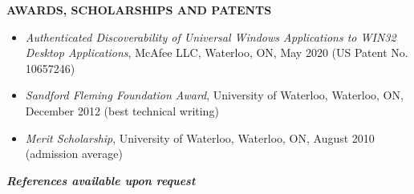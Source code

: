 \documentclass[10pt,letterpaper]{article}
\begin{document}
\textbf{AWARDS, SCHOLARSHIPS AND PATENTS} \hrulefill \\
\begin{adjustwidth}{0.1in}{0.5in}
    \begin{itemize}
    \item \emph{Authenticated Discoverability of Universal Windows Applications to WIN32 Desktop Applications}, McAfee LLC, Waterloo, ON, May 2020
	    (US Patent No. 10657246)
	\item \emph{Sandford Fleming Foundation Award}, University of Waterloo, Waterloo, ON, December 2012
	    (best technical writing)
	\item \emph{Merit Scholarship}, University of Waterloo, Waterloo, ON, August 2010
	    (admission average)
    \end{itemize}
\end{adjustwidth}
\vspace{1em}
\begin{center}
	\textbf{\textit{References available upon request}}
\end{center}
\end{document}
